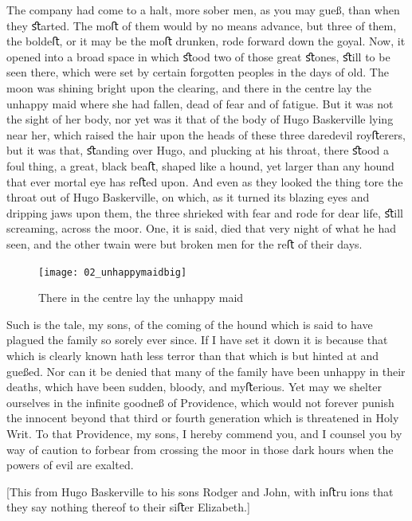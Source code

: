 \documentclass[paper=a5,BCOR=7mm,twoside,DIV=calc,12pt,usegeometry,openany,chapterprefix,endperiod,headings=big]{scrbook} %
\begin{document}
The company had come to a halt, more sober men, as you may gueß, than when they ﬆarted. The moﬅ of them would by no means advance, but three of them, the boldeﬅ, or it may be the moﬅ drunken, rode forward down the goyal. Now, it opened into a broad space in which ﬆood two of those great ﬆones, ﬆill to be seen there, which were set by certain forgotten peoples in the days of old. The moon was shining bright upon the clearing, and there in the centre lay the unhappy maid where she had fallen, dead of fear and of fatigue. But it was not the sight of her body, nor yet was it that of the body of Hugo Baskerville lying near her, which raised the hair upon the heads of these three daredevil royﬅerers, but it was that, ﬆanding over Hugo, and plucking at his throat, there ﬆood a foul thing, a great, black beaﬅ, shaped like a hound, yet larger than any hound that ever mortal eye has reﬅed upon. And even as they looked the thing tore the throat out of Hugo Baskerville, on which, as it turned its blazing eyes and dripping jaws upon them, the three shrieked with fear and rode for dear life, ﬆill screaming, across the moor. One, it is said, died that very night of what he had seen, and the other twain were but broken men for the reﬅ of their days.

\begin{figure}[tbph]
\centering
\texttt{[image: 02\_unhappymaidbig]}
\caption{There in the centre lay the unhappy maid}
\end{figure}

Such is the tale, my sons, of the coming of the hound which is said to have plagued the family so sorely ever since. If I have set it down it is because that which is clearly known hath less terror than that which is but hinted at and gueßed. Nor can it be denied that many of the family have been unhappy in their deaths, which have been sudden, bloody, and myﬅerious. Yet may we shelter ourselves in the inﬁnite goodneß of Providence, which would not forever punish the innocent beyond that third or fourth generation which is threatened in Holy Writ. To that Providence, my sons, I hereby commend you, and I counsel you by way of caution to forbear from crossing the moor in those dark hours when the powers of evil are exalted.

[This from Hugo Baskerville to his sons Rodger and John, with inﬅruions that they say nothing thereof to their siﬅer Elizabeth.]

\clearpage

\normalfont
\end{document}
